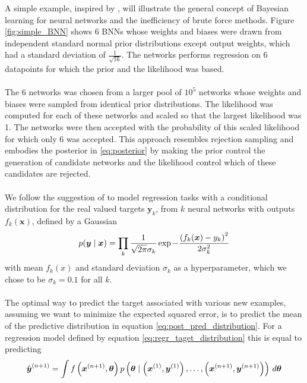 \noindent
A simple example, inspired by \cite{neal2012bayesian}, will illustrate the general concept of Bayesian learning for neural networks and the inefficiency of brute force methods. Figure \ref{fig:simple_BNN} shows 6 BNNs whose weights and biases were drawn from independent standard normal prior distributions except output weights, which had a standard deviation of $\frac{1}{\sqrt{16}}$. The networks performs regression on 6 datapoints for which the prior and the likelihood was based. \\
\\
The 6 networks was chosen from a larger pool of $10^5$ networks whose weights and biases were sampled from identical prior distributions. The likelihood was computed for each of these networks and scaled so that the largest likelihood was 1. The networks were then accepted with the probability of this scaled likelihood for which only 6 was accepted. This approach resembles rejection sampling and embodies the posterior in \ref{eq:posterior} by making the prior control the generation of candidate networks and the likelihood control which of these candidates are rejected.\\
\\
We follow the suggestion of \cite{neal2012bayesian} to model regression tasks with a conditional distribution for the real valued targets $\boldsymbol{y}_k$, from $k$ neural networks with outputs $f_k(\boldsymbol{x})$, defined by a Gaussian 
\begin{equation}\label{eq:regr_taget_distribution}
    p(\boldsymbol{y} \mid \boldsymbol{x}) = \prod_k \frac{1}{\sqrt{2 \pi} \sigma_k} \exp{- \frac{\left (f_k(\boldsymbol{x}) - y_k\right)^2}{2 \sigma_k^2}}
\end{equation}
with mean $f_k(x)$ and standard deviation $\sigma_k$ as a hyperparameter, which we chose to be $\sigma_k = 0.1$ for all $k$.
\\
\\
The optimal way to predict the target associated with various new examples, assuming we want to minimize the expected squared error, is to predict the mean of the predictive distribution in equation \ref{eq:post_pred_distribution}. For a regression model defined by equation \ref{eq:regr_taget_distribution} this is equal to predicting 
\begin{equation*}
    \hat{\boldsymbol{y}}^{(n+1)} = \int f\left (\boldsymbol{x}^{(n+1)}, \boldsymbol{\theta}\right) p\left (\boldsymbol{\theta} \mid \left (\boldsymbol{x}^{(1)}, \boldsymbol{y}^{(1)}\right), \dots, \left (\boldsymbol{x}^{(n+1)}, \boldsymbol{y}^{(n+1)}\right)\right) \, d \boldsymbol{\theta}
\end{equation*}

